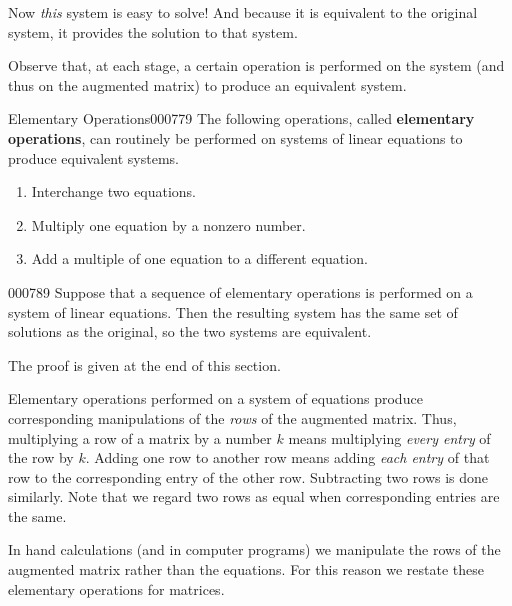Now \textit{this} system is easy to solve! And because it is equivalent to the original system, it provides the solution to that system.

Observe that, at each stage, a certain operation is performed on the system (and thus on the augmented matrix) to produce an equivalent system.

\begin{definition}{Elementary Operations}{000779}
The following operations, called \textbf{elementary operations}, can routinely be performed on systems of linear equations to produce equivalent systems.

\begin{enumerate}[label={\Roman*.}]
\item Interchange two equations.

\item Multiply one equation by a {\normalfont nonzero} number.

\item Add a multiple of one equation to a {\normalfont different} equation.

\end{enumerate}
\end{definition}

\begin{theorem}{}{000789}
Suppose that a sequence of elementary operations is performed on a system of linear equations. Then the resulting system has the same set of solutions as the original, so the two systems are equivalent.
\end{theorem}

\noindent The proof is given at the end of this section.

Elementary operations performed on a system of equations produce corresponding manipulations of the \textit{rows} of the augmented matrix. Thus, multiplying a row of a matrix by a number $k$ means multiplying \textit{every entry} of the row by $k$. Adding one row to another row means adding \textit{each entry} of that row to the corresponding entry of the other row. Subtracting two rows is done similarly. Note that we regard two rows as equal when corresponding entries are the same.

In hand calculations (and in computer programs) we manipulate the rows of the augmented matrix rather than the equations. For this reason we restate these elementary operations for matrices.

